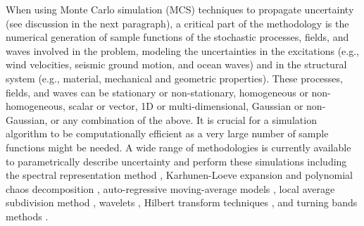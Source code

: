 When using Monte Carlo simulation (MCS) techniques to propagate uncertainty (see discussion in the next paragraph), a critical part of the methodology is the numerical generation of sample functions of the stochastic processes, fields, and waves involved in the problem, modeling the uncertainties in the excitations (e.g., wind velocities, seismic ground motion, and ocean waves) and in the structural system (e.g., material, mechanical and geometric properties). These processes, fields, and waves can be stationary or non-stationary, homogeneous or non-homogeneous, scalar or vector, 1D or multi-dimensional, Gaussian or non-Gaussian, or any combination of the above. It is crucial for a simulation algorithm to be computationally efficient as a very large number of sample functions might be needed. A wide range of methodologies is currently available to parametrically describe uncertainty and perform these simulations including the spectral representation method \citep{li1991simulation, shinozuka1991simulation, shields2011simple, benowitz2015simulation}, Karhunen-Loeve expansion and polynomial chaos decomposition \citep{ghanem1991stochastic}, auto-regressive moving-average models \citep{spanos1983arma,deodatis1988autoregressive}, local average subdivision method \citep{fenton1990simulation}, wavelets \citep{zeldin1996random}, Hilbert transform techniques \citep{wang2014modeling}, and turning bands methods \citep{mantoglou1982turning}.

